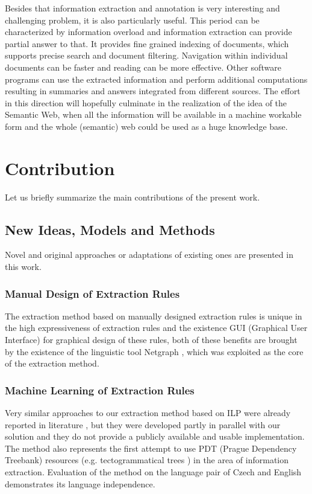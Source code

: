 \documentclass[12pt,a4paper,twoside,notitlepage]{article}
\begin{document}
Besides that information extraction and annotation is very interesting and challenging problem, it is also particularly useful. This period can be characterized by information overload and information extraction can provide partial answer to that. It provides fine grained indexing of documents, which supports precise search and document filtering. Navigation within individual documents can be faster and reading can be more effective. Other software programs can use the extracted information and perform additional computations resulting in summaries and answers integrated from different sources.  The effort in this direction will hopefully culminate in the realization of the idea of the Semantic Web, when all the information will be available in a machine workable form and the whole (semantic) web could be used as a huge knowledge base.



\section{Contribution} \label{sec:phd_contributions}

Let us briefly summarize the main contributions of the present work.

\subsection{New Ideas, Models and Methods}

Novel and original approaches or adaptations of existing ones are presented in this work.

\subsubsection{Manual Design of Extraction Rules}
The extraction method based on manually designed extraction rules is unique in the high expressiveness of extraction rules and the existence GUI (Graphical User Interface) for graphical design of these rules, both of these benefits are brought by the existence of the linguistic tool Netgraph \citep{biblio:MiNetgraphA2006}, which was exploited as the core of the extraction method.

\subsubsection{Machine Learning of Extraction Rules}
Very similar approaches to our extraction method based on ILP were already reported in literature \citep{DBLP:conf/ilp/RamakrishnanJBS07, aitken02:_learn_infor_extrac_rules}, but they were developed partly in parallel with our solution and they do not provide a publicly available and usable implementation. The method also represents the first attempt to use PDT (Prague Dependency Treebank) resources (e.g. tectogrammatical trees \citep{biblio:MiBeAnnotationtectogrammatical2006}) in the area of information extraction. Evaluation of the method on the language pair of Czech and English demonstrates its language independence.
\end{document}
